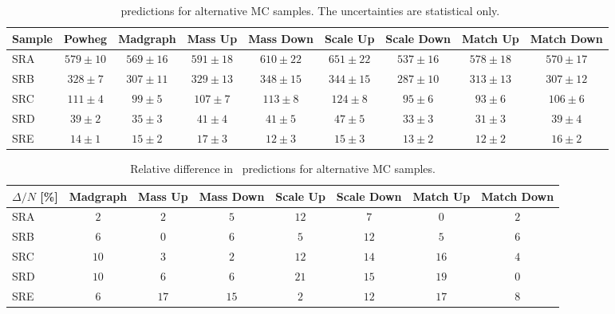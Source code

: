 \begin{table}[!h]
\begin{center}
{\footnotesize
\begin{tabular}{l||c||c|c|c|c|c|c|c}
\hline
Sample              & Powheg & Madgraph & Mass Up & Mass Down & Scale Up & Scale Down &
Match Up & Match Down \\
\hline
\hline
SRA 	 & $579 \pm 10$ & $569 \pm 16$ & $591 \pm 18$ & $610 \pm 22$ & $651 \pm 22$ & $537 \pm 16$ & $578 \pm 18$ & $570 \pm 17$  \\
\hline
SRB 	 & $328 \pm 7$ & $307 \pm 11$ & $329 \pm 13$ & $348 \pm 15$ & $344 \pm 15$ & $287 \pm 10$ & $313 \pm 13$ & $307 \pm 12$  \\
\hline
SRC 	 & $111 \pm 4$ & $99 \pm 5$ & $107 \pm 7$ & $113 \pm 8$ & $124 \pm 8$ & $95 \pm 6$ & $93 \pm 6$ & $106 \pm 6$  \\
\hline
SRD 	 & $39 \pm 2$ & $35 \pm 3$ & $41 \pm 4$ & $41 \pm 5$ & $47 \pm 5$ & $33 \pm 3$ & $31 \pm 3$ & $39 \pm 4$  \\
\hline
SRE 	 & $14 \pm 1$ & $15 \pm 2$ & $17 \pm 3$ & $12 \pm 3$ & $15 \pm 3$ & $13 \pm 2$ & $12 \pm 2$ & $16 \pm 2$  \\
\hline
\end{tabular}}
\caption{ \ttdl\ predictions for alternative MC samples. The uncertainties are statistical only.
\label{tab:ttdlalt}}
\end{center}
\end{table}


\begin{table}[!h]
\begin{center}
{\footnotesize
\begin{tabular}{l||c|c|c|c|c|c|c}
\hline
$\Delta/N$  [\%] & Madgraph & Mass Up & Mass Down & Scale Up & Scale Down &
Match Up & Match Down \\
\hline
\hline
SRA 	 & $2$ & $2$ & $5$ & $12$ & $7$ & $0$ & $2$  \\
\hline
SRB 	 & $6$ & $0$ & $6$ & $5$ & $12$ & $5$ & $6$  \\
\hline
SRC 	 & $10$ & $3$ & $2$ & $12$ & $14$ & $16$ & $4$  \\
\hline
SRD 	 & $10$ & $6$ & $6$ & $21$ & $15$ & $19$ & $0$  \\
\hline
SRE 	 & $6$ & $17$ & $15$ & $2$ & $12$ & $17$ & $8$  \\
\hline
\end{tabular}}
\caption{ Relative difference in \ttdl\ predictions for alternative MC samples. 
\label{tab:fracdiff}}
\end{center}
\end{table}


